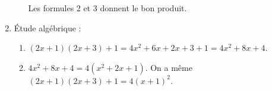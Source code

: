 \begin{enumerate}
\begin{enumerate}
Les formules 2 et 3 donnent le bon produit.
	\end{enumerate} 
\item Étude algébrique : 
	\begin{enumerate}
		\item %
$(2x + 1)(2x + 3) + 1 = 4x^2 + 6x + 2x + 3 + 1 = 4x^2 + 8x + 4$.		 
		\item %
$4x^2 + 8x + 4 = 4 \left(x^2 + 2x + 1\right)$. On a même $(2x + 1)(2x + 3) + 1 = 4(x + 1)^2$.
	\end{enumerate} 
\end{enumerate} 

\vspace{0,5cm}

